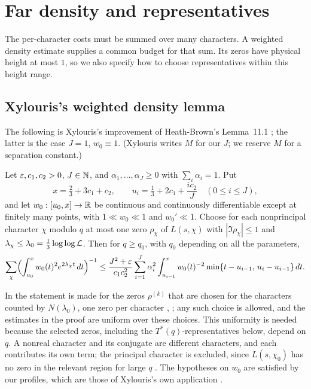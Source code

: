 \section{Far density and representatives}\label{sec:far}

The per-character costs must be summed over many characters. A weighted density
estimate supplies a common budget for that sum. Its zeros have physical height at most
$1$, so we also specify how to choose representatives within this height range.

\subsection{Xylouris's weighted density lemma}
The following is Xylouris's improvement \cite[Lemma~5.1, (5.19), p.~66]{Xylouris2011nullstellen} of
Heath-Brown's Lemma~11.1 \cite{HeathBrown1992zero}; the latter is the case $J=1$, $w_0\equiv1$.
(Xylouris writes $M$ for our $J$; we reserve $M$ for a separation constant.)

\begin{inp}\label{inp:far}
Let $\varepsilon,c_1,c_2>0$, $J\in\mathbb{N}$, and $\alpha_1,\dots,\alpha_J\ge0$ with $\sum_i\alpha_i=1$. Put
\[
  x=\tfrac23+3c_1+c_2,\qquad u_i=\tfrac13+2c_1+\frac{ic_2}{J}\quad(0\le i\le J),
\]
and let $w_0:[u_0,x]\to\mathbb{R}$ be continuous and continuously differentiable except at finitely many
points, with $1\ll w_0\ll1$ and $w_0'\ll1$. Choose for each nonprincipal character $\chi$ modulo
$q$ at most one zero $\rho_\chi$ of $L(s,\chi)$ with $|\Im\rho_\chi|\le1$ and
$\lambda_\chi\le\lambda_0=\frac13\log\log\mathcal{L}$. Then for $q\ge q_0$, with $q_0$ depending on all
the parameters,
\[
  \sum_\chi\Bigl(\int_{u_0}^xw_0(t)^2e^{2\lambda_\chi t}\,dt\Bigr)^{-1}\le
  \frac{J^2+\varepsilon}{c_1c_2^2}\sum_{i=1}^J\alpha_i^2\int_{u_{i-1}}^xw_0(t)^{-2}
  \min\{t-u_{i-1},\,u_i-u_{i-1}\}\,dt .
\]
\end{inp}

In \cite{Xylouris2011nullstellen} the statement is made for the zeros $\rho^{(k)}$ that are chosen
for the characters counted by $N(\lambda_0)$, one zero per character \cite[\S3.2.2,
pp.~25--26]{Xylouris2011nullstellen}, \cite[\S11]{HeathBrown1992zero}; any such choice is allowed, and
the estimates in the proof \cite[pp.~67--72]{Xylouris2011nullstellen} are uniform over
these choices. This uniformity is needed because the selected zeros, including the
$T^*(q)$-representatives below, depend on $q$. A nonreal character and
its conjugate are different characters, and each contributes its own term; the principal
character is excluded, since $L(s,\chi_0)$ has no zero in the relevant region for large $q$
\cite[p.~21]{Xylouris2011nullstellen}. The hypotheses on $w_0$ are satisfied by our profiles, which
are those of Xylouris's own application \cite[(6.20)--(6.21), p.~80]{Xylouris2011nullstellen}.

